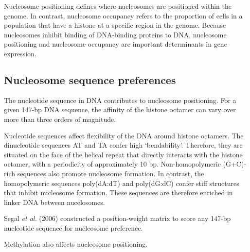 \documentclass[parskip=full, numbers=noenddot]{scrreprt}
\begin{document}

Nucleosome positioning defines where nucleosomes are positioned within the genome. %
In contrast, nucleosome occupancy refers to the proportion of cells in a population that have a histone at a specific region in the genome. %
Because nucleosomes inhibit binding of DNA-binding proteins to DNA, nucleosome positioning and nucleosome occupancy are important determinants in gene expression. %

\subsection{Nucleosome sequence preferences}
\label{ssec:emsaselex_intro_seqpref}

The nucleotide sequence in DNA contributes to nucleosome positioning.  For a given 147-bp DNA sequence, the affinity of the histone octamer can vary over more than three orders of magnitude.

Nucleotide sequences affect flexibility of the DNA around histone octamers.  The dinucleotide sequences AT and TA confer high `bendability'.  Therefore, they are situated on the face of the helical repeat that directly interacts with the histone octamer, with a periodicity of approximately 10 bp.  Non-homopolymeric (G+C)-rich sequences also promote nucleosome formation.  In contrast, the homopolymeric sequences poly(dA:dT) and poly(dG:dC) confer stiff structures that inhibit nucleosome formation.  These sequences are therefore enriched in linker DNA between nucelosomes.

Segal \emph{et al.} (2006) %
constructed a position-weight matrix to score any 147-bp nucleotide sequence for nucleosome preference.

Methylation also affects nucleosome positioning.



\subsection{}
\label{ssec:emsaselex_intro_why}
\end{document}
